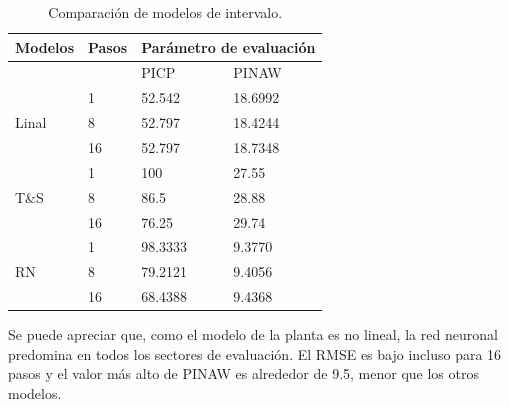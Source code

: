 \documentclass[12pt]{article}
\begin{document}
\begin{table}[htbp]
  \centering
  \caption{Comparación de modelos de intervalo.}
\begin{tabular}{|l|l|l|l|}
	\hline
	Modelos                & Pasos & \multicolumn{2}{l|}{Parámetro de evaluación} \\ \hline
	\multicolumn{2}{|l|}{}         & PICP                  & PINAW                \\ \hline
	\multirow{3}{*}{Linal} & 1     & 52.542                & 18.6992              \\ \cline{2-4}
	& 8     & 52.797                & 18.4244              \\ \cline{2-4}
	& 16    & 52.797                & 18.7348              \\ \hline
	\multirow{3}{*}{T\&S}  & 1     & 100                   & 27.55                \\ \cline{2-4}
	& 8     & 86.5                  & 28.88                \\ \cline{2-4}
	& 16    & 76.25                 & 29.74                \\ \hline
	\multirow{3}{*}{RN}    & 1     & 98.3333               & 9.3770               \\ \cline{2-4}
	& 8     & 79.2121               & 9.4056               \\ \cline{2-4}
	& 16    & 68.4388               & 9.4368               \\ \hline
\end{tabular}
  \label{t_CompCov}%
\end{table}%

Se puede apreciar que, como el modelo de la planta es no lineal, la red neuronal predomina en todos los sectores de evaluación. El RMSE es bajo incluso para 16 pasos y el valor más alto de PINAW es alrededor de 9.5, menor que los otros modelos.
\end{document}
